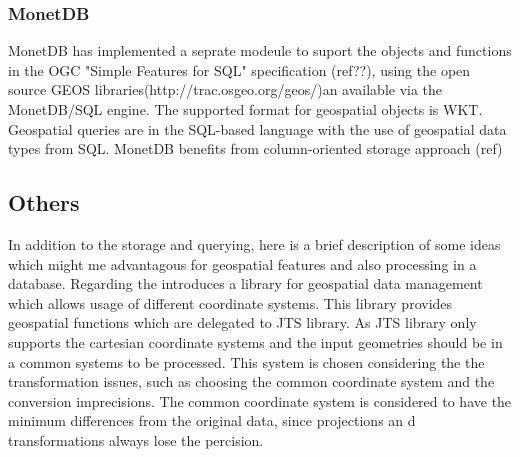 \documentclass[a4paper,12pt]{article}
\begin{document}
\subsubsection{MonetDB}
MonetDB has implemented a seprate modeule to suport the objects and functions in the OGC "Simple Features for SQL" specification (ref??), using the open source GEOS libraries(http://trac.osgeo.org/geos/)an available via the MonetDB/SQL engine. The supported format for geospatial objects is WKT. Geospatial queries are in the SQL-based language with the use of geospatial data types from SQL. 
MonetDB benefits from column-oriented storage approach (ref)


\subsection{Others}
In addition to the storage and querying, here is a brief description of some ideas which might me advantagous for geospatial features and also processing in a database. 
Regarding the \cite{Schwarz2004} introduces a library for geospatial data management which allows usage of different coordinate systems. This library provides geospatial functions which are delegated to JTS library. As JTS library only supports the cartesian coordinate systems and the input geometries should be in a common systems to be processed. This system is chosen considering the the transformation issues, such as choosing the common coordinate system and the conversion imprecisions. The common coordinate system is considered to have the minimum differences from the original data, since projections an d transformations always lose the percision.
\end{document}
